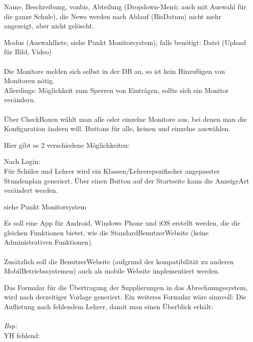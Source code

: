 \begin{description}[style=nextline]
\begin{description}[style=nextline]
		\end{description}
	\item[News]
		Name, Beschreibung, von­bis, Abteilung (Dropdown-­Menü; auch mit Auswahl für die ganze Schule), die News werden nach Ablauf (Bis­Datum) nicht mehr angezeigt, aber nicht gelöscht.
	\item[Monitore]
		Modus (Auswahlliste, siehe Punkt Monitorsystem), falls benötigt: Datei (Upload für Bild, Video)\\
		\\
		Die Monitore melden sich selbst in der DB an, so ist kein Hinzufügen von Monitoren nötig. \\
		Allerdings: Möglichkeit zum Sperren von Einträgen, sollte sich ein Monitor verändern.\\
		\\
		Über Check­Boxen wählt man alle oder einzelne Monitore aus, bei denen man die Konfiguration ändern will. Buttons für alle, keinen und einzelne auswählen.
	 \item[Ausgabe]
	 	Hier gibt es 2 verschiedene Möglichkeiten:
	 	\begin{description}[style=nextline]
	 		\item[Benutzer-Website/App]
	 			Nach Login:\\
	 			Für Schüler und Lehrer wird ein Klassen­/Lehrer­spezifischer angepasster Stundenplan generiert. Über einen Button auf der Startseite kann die Anzeige­Art verändert werden.
	 		\item[Monitore]
	 			siehe Punkt Monitorsystem
	 	\end{description}
	\item[App]
		Es soll eine App für Android, Windows Phone und iOS erstellt werden, die die gleichen Funktionen bietet, wie die Standard­Benutzer­Website (keine Administrativen Funktionen).\\
		\\
		Zusätzlich soll die Benutzer­Website (aufgrund der kompatibilität zu anderen Mobil­Betriebssystemen) auch als mobile Website implementiert werden.
	 \item[Formular]
	 	Das Formular für die Übertragung der Supplierungen in das Abrechnungssystem, wird nach derzeitiger Vorlage generiert. Ein weiteres Formular wäre sinnvoll: Die Auflistung nach fehlendem Lehrer, damit man einen Überblick erhält:\\
	 	\\
	 	\textit{Bsp:}\\
	 	YH fehlend:
\begin{tabbing}

\end{tabbing}
\end{description}
